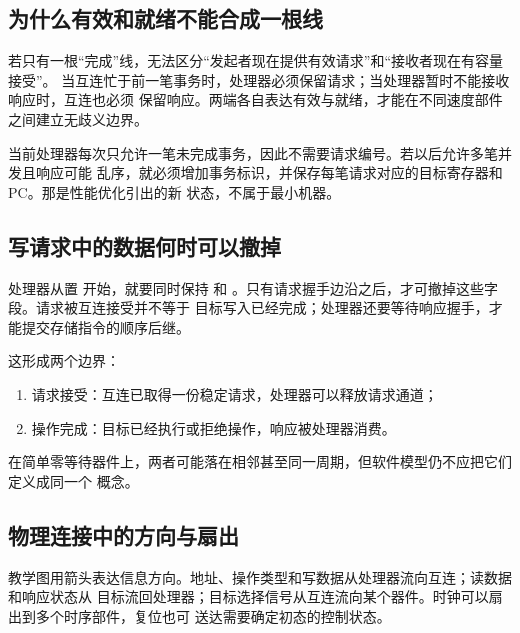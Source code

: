 \subsection{为什么有效和就绪不能合成一根线}

若只有一根“完成”线，无法区分“发起者现在提供有效请求”和“接收者现在有容量接受”。
当互连忙于前一笔事务时，处理器必须保留请求；当处理器暂时不能接收响应时，互连也必须
保留响应。两端各自表达有效与就绪，才能在不同速度部件之间建立无歧义边界。

当前处理器每次只允许一笔未完成事务，因此不需要请求编号。若以后允许多笔并发且响应可能
乱序，就必须增加事务标识，并保存每笔请求对应的目标寄存器和 PC。那是性能优化引出的新
状态，不属于最小机器。

\subsection{写请求中的数据何时可以撤掉}

处理器从置  开始，就要同时保持  和
。只有请求握手边沿之后，才可撤掉这些字段。请求被互连接受并不等于
目标写入已经完成；处理器还要等待响应握手，才能提交存储指令的顺序后继。

这形成两个边界：

\begin{enumerate}
\item 请求接受：互连已取得一份稳定请求，处理器可以释放请求通道；
\item 操作完成：目标已经执行或拒绝操作，响应被处理器消费。
\end{enumerate}

在简单零等待器件上，两者可能落在相邻甚至同一周期，但软件模型仍不应把它们定义成同一个
概念。

\subsection{物理连接中的方向与扇出}

教学图用箭头表达信息方向。地址、操作类型和写数据从处理器流向互连；读数据和响应状态从
目标流回处理器；目标选择信号从互连流向某个器件。时钟可以扇出到多个时序部件，复位也可
送达需要确定初态的控制状态。

\begin{center}
\end{center}

